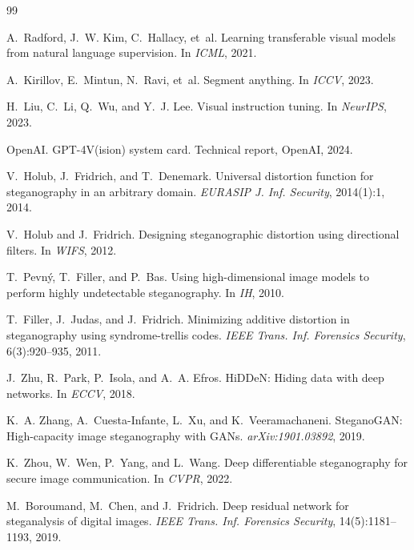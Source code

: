 \documentclass[10pt,a4paper]{article}
\begin{document}
\begin{thebibliography}{99}

A.~Radford, J.~W. Kim, C.~Hallacy, et~al.
\newblock Learning transferable visual models from natural language
supervision.
\newblock In \emph{ICML}, 2021.

A.~Kirillov, E.~Mintun, N.~Ravi, et~al.
\newblock Segment anything.
\newblock In \emph{ICCV}, 2023.

H.~Liu, C.~Li, Q.~Wu, and Y.~J. Lee.
\newblock Visual instruction tuning.
\newblock In \emph{NeurIPS}, 2023.

OpenAI.
\newblock GPT-4V(ision) system card.
\newblock Technical report, OpenAI, 2024.

V.~Holub, J.~Fridrich, and T.~Denemark.
\newblock Universal distortion function for steganography in an arbitrary
domain.
\newblock \emph{EURASIP J. Inf. Security}, 2014(1):1, 2014.

V.~Holub and J.~Fridrich.
\newblock Designing steganographic distortion using directional filters.
\newblock In \emph{WIFS}, 2012.

T.~Pevn\'{y}, T.~Filler, and P.~Bas.
\newblock Using high-dimensional image models to perform highly undetectable
steganography.
\newblock In \emph{IH}, 2010.

T.~Filler, J.~Judas, and J.~Fridrich.
\newblock Minimizing additive distortion in steganography using
syndrome-trellis codes.
\newblock \emph{IEEE Trans. Inf. Forensics Security}, 6(3):920--935, 2011.

J.~Zhu, R.~Park, P.~Isola, and A.~A. Efros.
\newblock HiDDeN: Hiding data with deep networks.
\newblock In \emph{ECCV}, 2018.

K.~A. Zhang, A.~Cuesta-Infante, L.~Xu, and K.~Veeramachaneni.
\newblock SteganoGAN: High-capacity image steganography with GANs.
\newblock \emph{arXiv:1901.03892}, 2019.

K.~Zhou, W.~Wen, P.~Yang, and L.~Wang.
\newblock Deep differentiable steganography for secure image
communication.
\newblock In \emph{CVPR}, 2022.

M.~Boroumand, M.~Chen, and J.~Fridrich.
\newblock Deep residual network for steganalysis of digital images.
\newblock \emph{IEEE Trans. Inf. Forensics Security}, 14(5):1181--1193,
2019.


\end{thebibliography}
\end{document}

